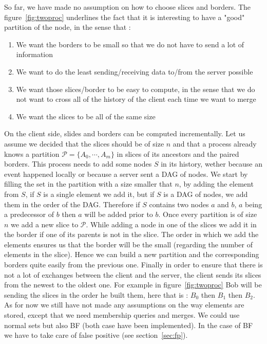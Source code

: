 So far, we have made no assumption on how to choose slices and borders. The figure~\ref{fig:twoproc} underlines the fact that it is interesting to have a "good" partition of the node, in the sense that :
\begin{enumerate}
 \item We want the borders to be small so that we do not have to send a lot of information
 \item We want to do the least sending/receiving data to/from the server possible
 \item We want those slices/border to be easy to compute, in the sense that we do not want to cross all of the history of the client each time we want to merge
 \item We want the slices to be all of the same size
\end{enumerate}
On the client side, slides and borders can be computed incrementally. Let us assume we decided that the slices should be of size $n$ and that a process already knows a partition $\mathcal{P} = \{A_0,\cdots,A_m\}$ in slices of its ancestors and the paired borders. This process needs to add some nodes $S$ in its history, wether because an event happened locally or because a server sent a DAG of nodes. We start by filling the set in the partition with a size smaller that $n$, by adding the element from $S$, if $S$ is a single element we add it, but if $S$ is a DAG of nodes, we add them in the order of the DAG. Therefore if $S$ contains two nodes $a$ and $b$, $a$ being a predecessor of $b$ then $a$ will be added prior to $b$. Once every partition is of size $n$ we add a new slice to $\mathcal P$. While adding a node in one of the slices we add it in the border if one of its parents is not in the slice. The order in which we add the elements ensures us that the border will be the small (regarding the number of elements in the slice). Hence we can build a new partition and the 
corresponding borders quite easily from the previous one. Finally in order to ensure that there is not a lot of exchanges between the client and the 
server, the client sends its slices from the newest to the oldest one. For example in figure~\ref{fig:twoproc} Bob will be sending the slices in the order he built them, here that is : $B_0$ then $B_1$ then $B_2$.
As for now we still have not made any assumptions on the way elements are stored, except that we need membership queries and merges. We could use normal sets but also BF (both case have been implemented). In the case of BF we have to take care of false positive (see section~\ref{sec:fp}).
